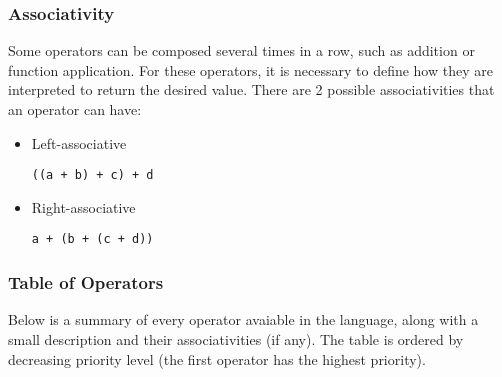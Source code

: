 \documentclass{article}
\def\code#1{\begin{footnotesize}\texttt{#1}\end{footnotesize}}
\begin{document}
\subsubsection{Associativity}

Some operators can be composed several times in a row, such as addition or function application.
For these operators, it is necessary to define how they are interpreted to return the desired value.
There are 2 possible associativities that an operator can have:

\begin{itemize}
  \item Left-associative \\
    \code{((a + b) + c) + d}
  \item Right-associative \\
    \code{a + (b + (c + d))}
\end{itemize}

\subsubsection{Table of Operators}

Below is a summary of every operator avaiable in the language, along with a small description and their associativities (if any).
The table is ordered by decreasing priority level (the first operator has the highest priority).

\medskip
\end{document}
